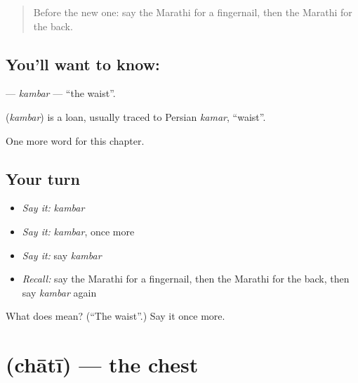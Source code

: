 \label{lesson:MR-C146-kambar}



\begin{quote}
Before the new one: say the Marathi for a fingernail, then the Marathi for the back.
\end{quote}

\subsection*{You'll want to know: }
\textbf{} — \emph{kambar} — \textquotedblleft{}the waist\textquotedblright{}.

\begin{cousinweb}
\textbf{} (\emph{kambar}) is a loan, usually traced to Persian \emph{kamar}, \textquotedblleft{}waist\textquotedblright{}.
\end{cousinweb}

\begin{grammarlens}[title={What you've built}]
One more word for this chapter.
\end{grammarlens}

\subsection*{Your turn}
\begin{itemize}
\raggedright
  \item \emph{Say it:} \emph{kambar}
  \item \emph{Say it:} \emph{kambar}, once more
  \item \emph{Say it:} say \emph{kambar}
  \item \emph{Recall:} say the Marathi for a fingernail, then the Marathi for the back, then say \emph{kambar} again
\end{itemize}

\begin{tcolorbox}[breakable,colback=teal!4,colframe=teal!35!black,title={Before you move on}]
What does  mean? (\textquotedblleft{}The waist\textquotedblright{}.) Say it once more.
\end{tcolorbox}
\section[\texorpdfstring{\mr{छाती} (chātī)}{छाती (chātī)}]{ (chātī) — the chest}

\label{lesson:MR-C146-chati}



